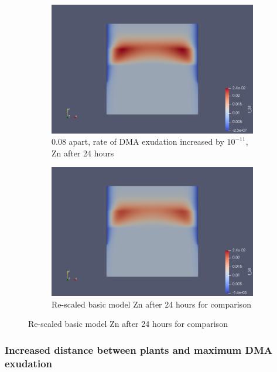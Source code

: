 \documentclass[11pt]{article}
\numberwithin{equation}{section}
\begin{document}
 \begin{figure}
     \centering
     \caption{DMA increased}
     \begin{subfigure}[t]{0.45\textwidth}
     \includegraphics[width=\textwidth]{Figures/testpics/IncreasedBufferZn24.png}
     \caption{0.08 apart, rate of DMA exudation increased by $10^{-11}$, Zn after 24 hours}
     \end{subfigure}
     \begin{subfigure}[t]{0.45\textwidth}
     \includegraphics[width=\textwidth]{Figures/testpics/24rescaledZinc.png}
     \caption{Re-scaled basic model Zn after 24 hours for comparison}
     \end{subfigure}
 \end{figure}
 
\FloatBarrier
\subsubsection{Increased distance between plants and maximum DMA exudation}
\end{document}
